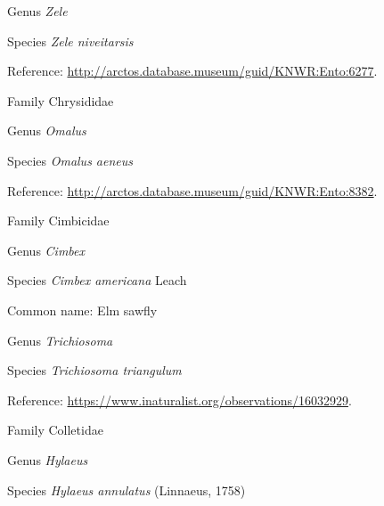 \documentclass[9pt, article]{memoir}
\begin{document}
\begin{multicols}{2}
\vspace{6pt}\noindent\hspace{30pt}Genus \textit{Zele}


\vspace{6pt}\noindent\hspace{36pt}Species \textit{Zele niveitarsis}


Reference: 
\url{http://arctos.database.museum/guid/KNWR:Ento:6277}.

\vspace{6pt}\noindent\hspace{24pt}Family Chrysididae


\vspace{6pt}\noindent\hspace{30pt}Genus \textit{Omalus}


\vspace{6pt}\noindent\hspace{36pt}Species \textit{Omalus aeneus}


Reference: 
\url{http://arctos.database.museum/guid/KNWR:Ento:8382}.

\vspace{6pt}\noindent\hspace{24pt}Family Cimbicidae


\vspace{6pt}\noindent\hspace{30pt}Genus \textit{Cimbex}


\vspace{6pt}\noindent\hspace{36pt}Species \textit{Cimbex americana} Leach


Common name: Elm sawfly

\vspace{6pt}\noindent\hspace{30pt}Genus \textit{Trichiosoma}


\vspace{6pt}\noindent\hspace{36pt}Species \textit{Trichiosoma triangulum}


Reference: 
\url{https://www.inaturalist.org/observations/16032929}.

\vspace{6pt}\noindent\hspace{24pt}Family Colletidae


\vspace{6pt}\noindent\hspace{30pt}Genus \textit{Hylaeus}


\vspace{6pt}\noindent\hspace{36pt}Species \textit{Hylaeus annulatus} (Linnaeus, 1758)



\end{multicols}
\end{document}
